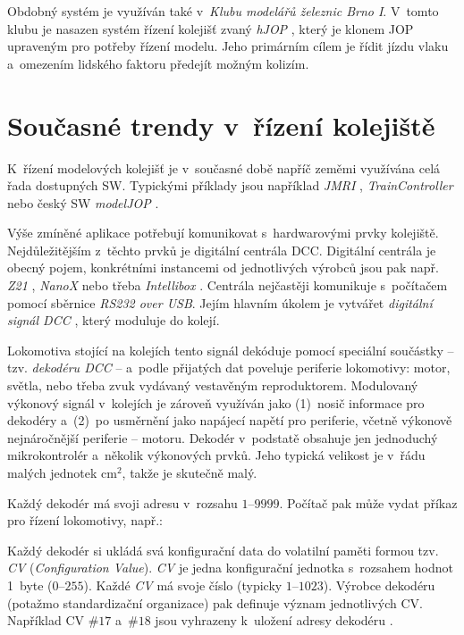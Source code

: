 Obdobný systém je využíván také v~\textit{Klubu modelářů železnic Brno I}.
V~tomto klubu je nasazen systém řízení kolejišť zvaný \textit{hJOP}
\cite{hjop:web}, který je klonem \gls{JOP} upraveným pro potřeby řízení modelu.
Jeho primárním cílem je řídit jízdu vlaku a~omezením lidského faktoru předejít
možným kolizím.

\section{Současné trendy v~řízení kolejiště}
\label{sec:trendy}

K~řízení modelových kolejišť je v~současné době napříč zeměmi využívána celá
řada dostupných SW. Typickými příklady jsou například \textit{JMRI}
\cite{jmri:web}, \textit{TrainController} \cite{traincontroller:web}
nebo český SW \textit{modelJOP} \cite{modeljop:web}.

Výše zmíněné aplikace potřebují komunikovat s~hardwarovými prvky kolejiště.
Nejdůležitějším z~těchto prvků je digitální centrála \gls{DCC}. Digitální
centrála je obecný pojem, konkrétními instancemi od jednotlivých výrobců jsou
pak např.  \textit{Z21} \cite{z21:web}, \textit{NanoX} \cite{nanox:web} nebo
třeba \textit{Intellibox} \cite{intellibox:web}. Centrála nejčastěji komunikuje
s~počítačem pomocí sběrnice \textit{RS232 over USB}. Jejím hlavním úkolem je
vytvářet \textit{digitální signál \gls{DCC}} \cite{nmra:dcc:ele}, který
moduluje do kolejí.

Lokomotiva stojící na kolejích tento signál dekóduje pomocí spe\-ciál\-ní
součástky -- tzv. \textit{dekodéru \gls{DCC}} -- a~podle přijatých dat poveluje
periferie lokomotivy: motor, světla, nebo třeba zvuk vydávaný vestavěným
reproduktorem. Modulovaný výkonový signál v~kolejích je zároveň využíván jako
(1)~nosič informace pro dekodéry a~(2)~po usměrnění jako napájecí napětí pro
periferie, včetně výkonově nejnáročnější periferie -- motoru. Dekodér
v~podstatě obsahuje jen jednoduchý mikrokontrolér a~několik výkonových prvků.
Jeho typická velikost je v~řádu malých jednotek cm$^2$, takže je skutečně malý.

Každý dekodér má svoji adresu v~rozsahu $1$--$9999$. Počítač pak může vydat
příkaz pro řízení lokomotivy, např.: \textit{}

Každý dekodér si ukládá svá konfigurační data do volatilní paměti formou tzv.
\textit{\gls{CV}} (\textit{Configuration Value}). \textit{\gls{CV}} je jedna
konfigurační jednotka s~rozsahem hodnot 1~byte ($0$--$255$). Každé
\textit{\gls{CV}} má svoje číslo (typicky $1$--$1023$). Výrobce dekodéru
(potažmo standardizační organizace) pak definuje význam jednotlivých \gls{CV}.
Například \gls{CV} $\#17$ a~$\#18$ jsou vyhrazeny k~uložení adresy dekodéru
\cite{zimo:cvs}.


